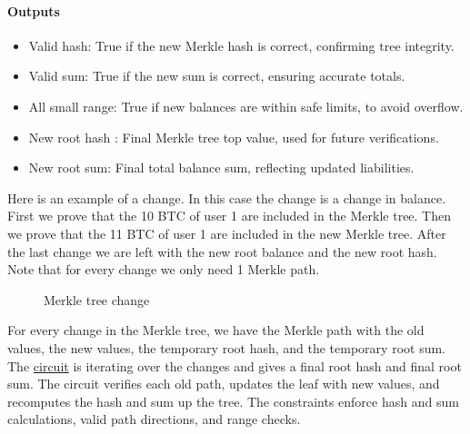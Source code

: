 \paragraph{Outputs}
\begin{itemize}
   \item Valid hash: True if the new Merkle hash is correct, confirming tree integrity.
   \item Valid sum: True if the new sum is correct, ensuring accurate totals.
   \item All small range: True if new balances are within safe limits, to avoid overflow.
   \item New root hash : Final Merkle tree top value, used for future verifications.
   \item New root sum: Final total balance sum, reflecting updated liabilities.
   \end{itemize}

Here is an example of a change. In this case the change is a change in balance. First we prove that the 10 BTC of user 1 are
included in the Merkle tree. Then we prove that the 11 BTC of user 1 are included in the new Merkle tree. After the last change we are left
with the new root balance and the new root hash. Note that for every change we only need 1 Merkle path.

\begin{figure}
   \hfill
   \hfill
   \hfill
   \caption{Merkle tree change}
   \end{figure}

For every change in the Merkle tree, we have the Merkle path with the old values, the new values, the temporary root hash, and the temporary root sum.
The \hyperref[subsec:plcc]{circuit} is iterating over the changes and gives a final root hash and final root sum. 
The circuit verifies each old path, updates the leaf with new values, and recomputes the hash and sum up the tree. 
The constraints enforce hash and sum calculations, valid path directions, and range checks.


